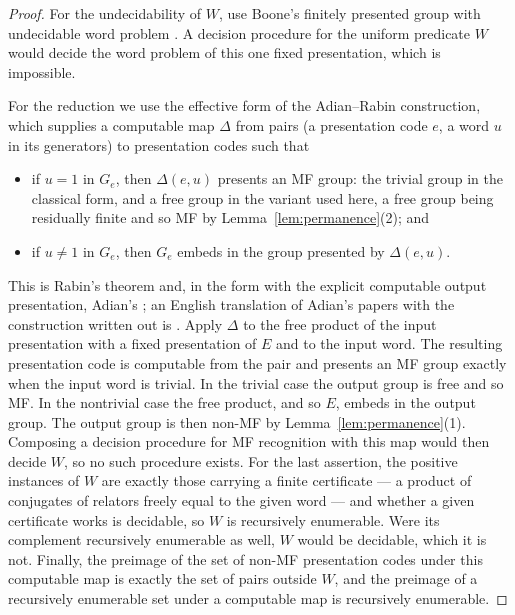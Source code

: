\documentclass[11pt]{amsart}
\theoremstyle{definition}
\theoremstyle{remark}
\theoremstyle{plain}
\begin{document}
\begin{proof}
For the undecidability of $W$, use Boone's finitely presented group with
undecidable word problem \cite{Boone}.  A decision procedure for the uniform
predicate $W$ would decide the word problem of this one fixed presentation,
which is impossible.

For the reduction we use the effective form of the Adian--Rabin
construction, which supplies a computable map $\Delta$ from pairs (a
presentation code $e$, a word $u$ in its generators) to presentation
codes such that

\begin{itemize}
\item if $u=1$ in $G_e$, then $\Delta(e,u)$ presents an MF group: the
trivial group in the classical form, and a free group in the variant
used here, a free group being residually finite and so MF by
Lemma~\ref{lem:permanence}(2); and
\item if $u\ne1$ in $G_e$, then $G_e$ embeds in the group presented by
$\Delta(e,u)$.
\end{itemize}

\noindent
This is Rabin's theorem \cite{Rabin58} and, in the form with the
explicit computable output presentation, Adian's \cite{Adian55}; an
English translation of Adian's papers with the construction written out
is \cite{NybergBrodda}.  Apply $\Delta$ to the free product of the
input presentation with a fixed presentation of $E$ and to the input
word.  The resulting presentation code is computable from the pair and
presents an MF group exactly when the input word is trivial.  In the
trivial case the output group is free and so MF\@.  In the nontrivial
case the free product, and so $E$, embeds in the output group.
The output group is then non-MF by Lemma~\ref{lem:permanence}(1).  Composing a
decision procedure for MF recognition with this map would then
decide $W$, so no such procedure exists.  For the last assertion, the
positive instances of $W$ are exactly those carrying a finite
certificate --- a product of conjugates of relators freely equal to
the given word --- and whether a given certificate works is
decidable, so $W$ is recursively enumerable.  Were its complement
recursively enumerable as well, $W$ would be decidable, which it is
not.  Finally, the preimage of the set of non-MF presentation codes
under this computable map is exactly the set of pairs outside $W$, and
the preimage of a recursively enumerable set under a computable map is
recursively enumerable.
\end{proof}
\end{document}
